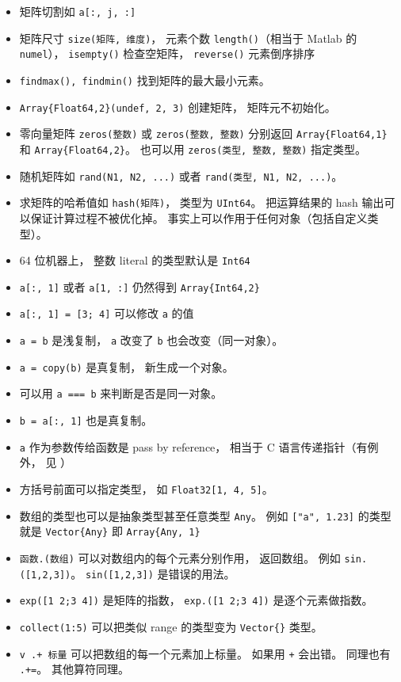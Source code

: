 \begin{itemize}
\item 矩阵切割如 \verb`a[:, j, :]`
\item 矩阵尺寸 \verb`size(矩阵, 维度)`， 元素个数 \verb`length()`（相当于 Matlab 的 \verb`numel`）， \verb`isempty()` 检查空矩阵， \verb`reverse()` 元素倒序排序
\item \verb`findmax(), findmin()` 找到矩阵的最大最小元素。
\item \verb`Array{Float64,2}(undef, 2, 3)` 创建矩阵， 矩阵元不初始化。
\item 零向量矩阵 \verb`zeros(整数)` 或 \verb`zeros(整数, 整数)` 分别返回 \verb`Array{Float64,1}` 和 \verb`Array{Float64,2}`。 也可以用 \verb`zeros(类型, 整数, 整数)` 指定类型。
\item 随机矩阵如 \verb`rand(N1, N2, ...)` 或者 \verb`rand(类型, N1, N2, ...)`。
\item 求矩阵的哈希值如 \verb`hash(矩阵)`， 类型为 \verb`UInt64`。 把运算结果的 hash 输出可以保证计算过程不被优化掉。 事实上可以作用于任何对象（包括自定义类型）。
\item 64 位机器上， 整数 literal 的类型默认是 \verb`Int64`
\item \verb`a[:, 1]` 或者 \verb`a[1, :]` 仍然得到 \verb`Array{Int64,2}`
\item \verb`a[:, 1] = [3; 4]` 可以修改 \verb`a` 的值
\item \verb`a = b` 是浅复制， \verb`a` 改变了 \verb`b` 也会改变（同一对象）。
\item \verb`a = copy(b)` 是真复制， 新生成一个对象。
\item 可以用 \verb`a === b` 来判断是否是同一对象。
\item \verb`b = a[:, 1]` 也是真复制。
\item \verb`a` 作为参数传给函数是 pass by reference， 相当于 C 语言传递指针（有例外， 见 ）
\item 方括号前面可以指定类型， 如 \verb`Float32[1, 4, 5]`。
\item 数组的类型也可以是抽象类型甚至任意类型 \verb`Any`。 例如 \verb`["a", 1.23]` 的类型就是 \verb`Vector{Any}` 即 \verb`Array{Any, 1}`
\item \verb`函数.(数组)` 可以对数组内的每个元素分别作用， 返回数组。 例如 \verb`sin.([1,2,3])`。 \verb`sin([1,2,3])` 是错误的用法。
\item \verb`exp([1 2;3 4])` 是矩阵的指数， \verb`exp.([1 2;3 4])` 是逐个元素做指数。
\item \verb`collect(1:5)` 可以把类似 range 的类型变为 \verb`Vector{}` 类型。
\item \verb`v .+ 标量` 可以把数组的每一个元素加上标量。 如果用 \verb`+` 会出错。 同理也有 \verb`.+=`。 其他算符同理。

\end{itemize}
